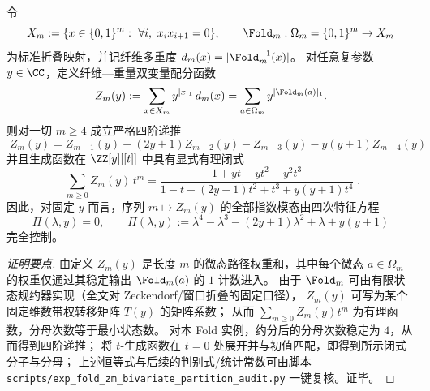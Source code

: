 \begin{conclusion}\label{con:xi-terminal-zm-order4-rational}
令
\[
X_m:=\{x\in\{0,1\}^m:\ \forall i,\ x_ix_{i+1}=0\},
\qquad
\Fold_m:\Omega_m=\{0,1\}^m\to X_m
\]
为标准折叠映射，并记纤维多重度 \(d_m(x)=|\Fold_m^{-1}(x)|\)。
对任意复参数 \(y\in\CC\)，定义纤维—重量双变量配分函数
\[
Z_m(y):=\sum_{x\in X_m} y^{|x|_1}\,d_m(x)
=\sum_{a\in\Omega_m} y^{|\Fold_m(a)|_1}.
\]
则对一切 \(m\ge 4\) 成立严格四阶递推
\[
\boxed{\;
Z_m(y)=Z_{m-1}(y)+(2y+1)Z_{m-2}(y)-Z_{m-3}(y)-y(y+1)Z_{m-4}(y)\;}
\]
并且生成函数在 \(\ZZ[y][[t]]\) 中具有显式有理闭式
\[
\boxed{\;
\sum_{m\ge 0} Z_m(y)\,t^m
=\frac{1+yt-yt^2-y^2t^3}{1-t-(2y+1)t^2+t^3+y(y+1)t^4}\; }.
\]
因此，对固定 \(y\) 而言，序列 \(m\mapsto Z_m(y)\) 的全部指数模态由四次特征方程
\[
\Pi(\lambda,y)=0,
\qquad
\Pi(\lambda,y):=\lambda^4-\lambda^3-(2y+1)\lambda^2+\lambda+y(y+1)
\]
完全控制。
\end{conclusion}
\begin{proof}[证明要点]
由定义 \(Z_m(y)\) 是长度 \(m\) 的微态路径权重和，其中每个微态 \(a\in\Omega_m\) 的权重仅通过其稳定输出 \(\Fold_m(a)\) 的 \(1\)-计数进入。
由于 \(\Fold_m\) 可由有限状态规约器实现（全文对 Zeckendorf/窗口折叠的固定口径），
\(Z_m(y)\) 可写为某个固定维数带权转移矩阵 \(T(y)\) 的矩阵系数；
从而 \(\sum_{m\ge 0}Z_m(y)t^m\) 为有理函数，分母次数等于最小状态数。
对本 Fold 实例，约分后的分母次数稳定为 \(4\)，从而得到四阶递推；
将 \(t\)-生成函数在 \(t=0\) 处展开并与初值匹配，即得到所示闭式分子与分母；
上述恒等式与后续的判别式/统计常数可由脚本 \texttt{scripts/exp\_fold\_zm\_bivariate\_partition\_audit.py} 一键复核。证毕。
\end{proof}

